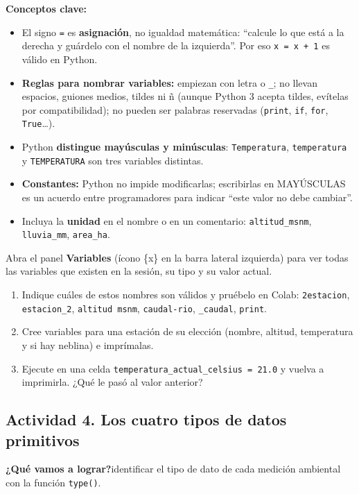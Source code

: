 \documentclass[11pt,a4paper]{article}
\newcommand{\code}[1]{\texttt{#1}}
\newcommand{\actividad}[1]{\begin{objetivo}\textbf{\color{tealProfundo}¿Qué vamos a lograr?}\enspace #1\end{objetivo}}
\begin{document}
\textbf{Conceptos clave:}
\begin{itemize}
  \item El signo \code{=} es \textbf{asignación}, no igualdad matemática: ``calcule lo que está a la derecha y guárdelo con el nombre de la izquierda''. Por eso \code{x = x + 1} es válido en Python.
  \item \textbf{Reglas para nombrar variables:} empiezan con letra o \code{\_}; no llevan espacios, guiones medios, tildes ni ñ (aunque Python 3 acepta tildes, evítelas por compatibilidad); no pueden ser palabras reservadas (\code{print}, \code{if}, \code{for}, \code{True}\ldots).
  \item Python \textbf{distingue mayúsculas y minúsculas}: \code{Temperatura}, \code{temperatura} y \code{TEMPERATURA} son tres variables distintas.
  \item \textbf{Constantes:} Python no impide modificarlas; escribirlas en MAYÚSCULAS es un acuerdo entre programadores para indicar ``este valor no debe cambiar''.
  \item Incluya la \textbf{unidad} en el nombre o en un comentario: \code{altitud\_msnm}, \code{lluvia\_mm}, \code{area\_ha}.
\end{itemize}

\begin{tip}
Abra el panel \textbf{Variables} (ícono \{x\} en la barra lateral izquierda) para ver todas las variables que existen en la sesión, su tipo y su valor actual.
\end{tip}

\begin{experimente}
\begin{enumerate}[nosep]
  \item Indique cuáles de estos nombres son válidos y pruébelo en Colab: \code{2estacion}, \code{estacion\_2}, \code{altitud msnm}, \code{caudal-rio}, \code{\_caudal}, \code{print}.
  \item Cree variables para una estación de su elección (nombre, altitud, temperatura y si hay neblina) e imprímalas.
  \item Ejecute en una celda \code{temperatura\_actual\_celsius = 21.0} y vuelva a imprimirla. ¿Qué le pasó al valor anterior?
\end{enumerate}
\end{experimente}

\subsection{Actividad 4. Los cuatro tipos de datos primitivos}
\actividad{identificar el tipo de dato de cada medición ambiental con la función \code{type()}.}
\end{document}
